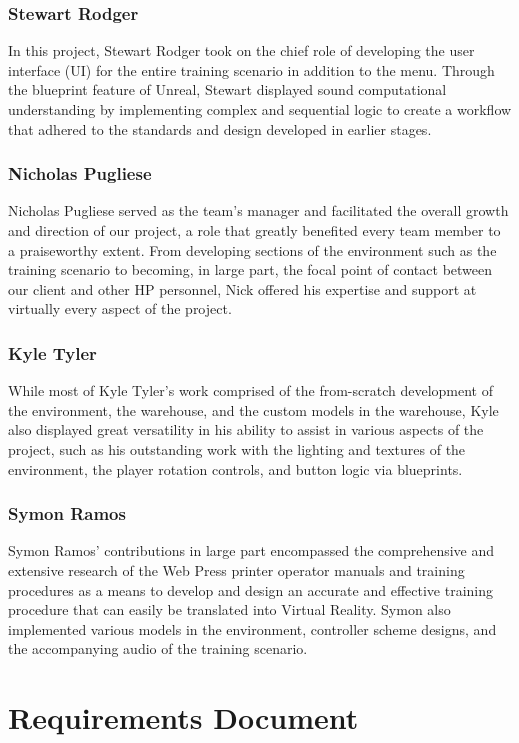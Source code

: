 \documentclass[onecolumn, draftclsnofoot,10pt, compsoc]{IEEEtran}
\begin{document}
\subsubsection{Stewart Rodger}
In this project, Stewart Rodger took on the chief role of developing the user interface (UI) for the entire training scenario in addition to the menu. Through the blueprint feature of Unreal, Stewart displayed sound computational understanding by implementing complex and sequential logic to create a workflow that adhered to the standards and design developed in earlier stages. 

\subsubsection{Nicholas Pugliese}
Nicholas Pugliese served as the team's manager and facilitated the overall growth and direction of our project, a role that greatly benefited every team member to a praiseworthy extent. From developing sections of the environment such as the training scenario to becoming, in large part, the focal point of contact between our client and other HP personnel, Nick offered his expertise and support at virtually every aspect of the project.

\subsubsection{Kyle Tyler}
While most of Kyle Tyler's work comprised of the from-scratch development of the environment, the warehouse, and the custom models in the warehouse, Kyle also displayed great versatility in his ability to assist in various aspects of the project, such as his outstanding work with the lighting and textures of the environment, the player rotation controls, and button logic via blueprints. 

\subsubsection{Symon Ramos}
Symon Ramos' contributions in large part encompassed the comprehensive and extensive research of the Web Press printer operator manuals and training procedures as a means to develop and design an accurate and effective training procedure that can easily be translated into Virtual Reality. Symon also implemented various models in the environment, controller scheme designs, and the accompanying audio of the training scenario.


\newpage
\section{Requirements Document}
\end{document}

